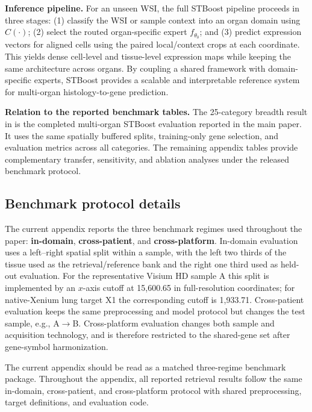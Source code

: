 \documentclass[sigconf,review]{acmart}
\begin{document}
\noindent\textbf{Inference pipeline.}
For an unseen WSI, the full STBoost pipeline proceeds in three stages: (1) classify the WSI or sample context into an organ domain using $C(\cdot)$; (2) select the routed organ-specific expert $f_{\theta_{\hat{o}}}$; and (3) predict expression vectors for aligned cells using the paired local/context crops at each coordinate. This yields dense cell-level and tissue-level expression maps while keeping the same architecture across organs. By coupling a shared framework with domain-specific experts, STBoost provides a scalable and interpretable reference system for multi-organ histology-to-gene prediction.

\noindent\textbf{Relation to the reported benchmark tables.}
The 25-category breadth result in  is the completed
multi-organ STBoost evaluation reported in the main paper. It uses the same
spatially buffered splits, training-only gene selection, and evaluation metrics
across all categories. The remaining appendix tables provide complementary
transfer, sensitivity, and ablation analyses under the released benchmark
protocol.

\subsection{Benchmark protocol details}
\label{sec:benchmark_protocol}
The current appendix reports the three benchmark regimes used throughout the paper: \textbf{in-domain}, \textbf{cross-patient}, and \textbf{cross-platform}. In-domain evaluation uses a left--right spatial split within a sample, with the left two thirds of the tissue used as the retrieval/reference bank and the right one third used as held-out evaluation. For the representative Visium HD sample A this split is implemented by an $x$-axis cutoff at 15,600.65 in full-resolution coordinates; for native-Xenium lung target X1 the corresponding cutoff is 1,933.71. Cross-patient evaluation keeps the same preprocessing and model protocol but changes the test sample, e.g., A$\!\rightarrow\!$B. Cross-platform evaluation changes both sample and acquisition technology, and is therefore restricted to the shared-gene set after gene-symbol harmonization.

The current appendix should be read as a matched three-regime benchmark package. Throughout the appendix, all reported retrieval results follow the same in-domain, cross-patient, and cross-platform protocol with shared preprocessing, target definitions, and evaluation code.
\end{document}
